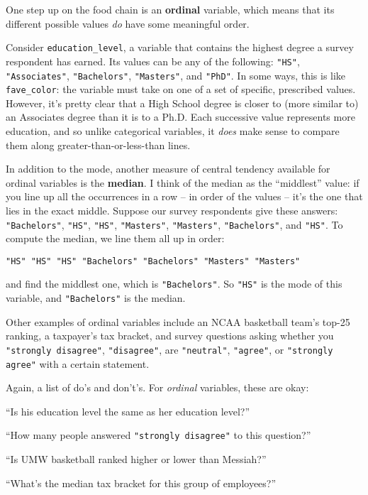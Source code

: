 One step up on the food chain is an \textbf{ordinal} variable, which means that
its different possible values \textit{do} have some meaningful order.

Consider \texttt{education\_level}, a variable that contains the highest degree
a survey respondent has earned. Its values can be any of the following:
\texttt{"HS"}, \texttt{"Associates"}, \texttt{"Bachelors"}, \texttt{"Masters"},
and \texttt{"PhD"}. In some ways, this is like \texttt{fave\_color}: the
variable must take on one of a set of specific, prescribed values. However,
it's pretty clear that a High School degree is closer to (more similar to) an
Associates degree than it is to a Ph.D. Each successive value represents more
education, and so unlike categorical variables, it \textit{does} make sense to
compare them along greater-than-or-less-than lines.


\medskip
In addition to the mode, another measure of central tendency available for
ordinal variables is the \textbf{median}. I think of the median as the
``middlest'' value: if you line up all the occurrences in a row -- in order of
the values -- it's the one that lies in the exact middle. Suppose our survey
respondents give these answers: \texttt{"Bachelors"}, \texttt{"HS"},
\texttt{"HS"}, \texttt{"Masters"}, \texttt{"Masters"}, \texttt{"Bachelors"},
and \texttt{"HS"}. To compute the median, we line them all up in order:

\vspace{-.15in}
\begin{center}
\small
\texttt{"HS"  "HS"  "HS"  "Bachelors"  "Bachelors"  "Masters"  "Masters"}
\end{center}
\vspace{-.15in}

and find the middlest one, which is \texttt{"Bachelors"}. So \texttt{"HS"} is
the mode of this variable, and \texttt{"Bachelors"} is the median.

\medskip
Other examples of ordinal variables include an NCAA basketball team's top-25
ranking, a taxpayer's tax bracket, and survey questions asking whether you
\texttt{"strongly disagree"}, \texttt{"disagree"}, are \texttt{"neutral"},
\texttt{"agree"}, or \texttt{"strongly agree"} with a certain statement.

\medskip
Again, a list of do's and don't's. For \textit{ordinal} variables, these are
okay:

\begin{compactitem}
\item[\leftthumbsup] ``Is his education level the same as her education level?''
\item[\leftthumbsup] ``How many people answered \texttt{"strongly disagree"} to
this question?''
\item[\leftthumbsup] ``Is UMW basketball ranked higher or lower than Messiah?''
\item[\leftthumbsup] ``What's the median tax bracket for this group of
employees?''
\end{compactitem}

